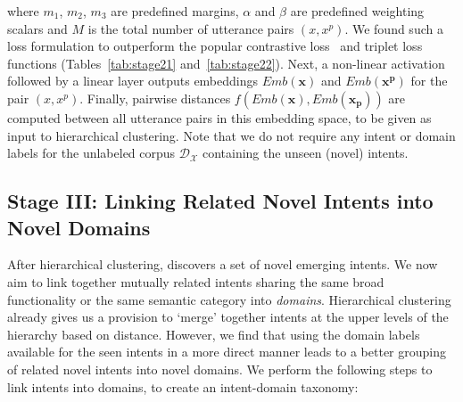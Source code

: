 \noindent where $m_1$, $m_2$, $m_3$ are predefined margins, $\alpha$ and $\beta$ are predefined weighting scalars and $M$ is the total number of utterance pairs $(x, x^p)$. We found such a loss formulation to outperform the popular contrastive loss~\cite{hadsell2006dimensionality} and triplet loss~\cite{schroff2015facenet} functions (Tables~\ref{tab:stage21} and~\ref{tab:stage22}). 
Next, a non-linear activation followed by a linear layer outputs embeddings $Emb(\bm{x})$ and $Emb(\bm{x^p})$ for the pair $(x, x^p)$. 
Finally, pairwise distances $f(Emb(\bm{x}), Emb(\bm{x_p}))$ are computed between all utterance pairs in this embedding space, to be given as input to %
hierarchical clustering. 
Note that we do not require any intent or domain labels for the unlabeled corpus $\mathcal{D_X}$ containing the unseen (novel) intents.
 





\subsection{Stage III: Linking Related Novel Intents into Novel Domains}
\label{sec:stage3}
After hierarchical clustering, \mname{} discovers a set of %
novel emerging intents. %
We now aim to link together mutually related intents sharing the same broad functionality or the same semantic category into \textit{domains}. 
Hierarchical clustering already gives us a provision to `merge' together intents at the upper levels of the hierarchy based on distance. %
However, we find that using the domain labels available for the seen intents in a more direct manner leads to a better grouping of related novel intents into novel domains. We perform the following steps to link intents into domains, to create an intent-domain taxonomy:

